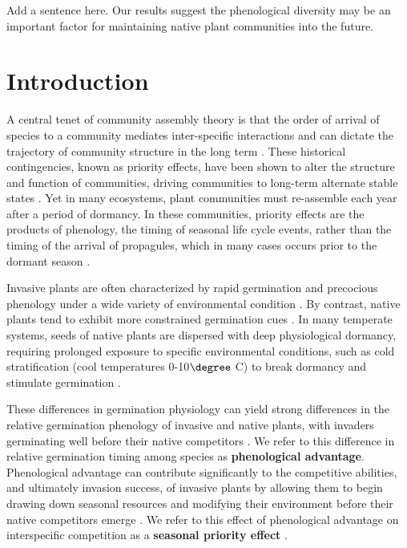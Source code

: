 \documentclass{article}\usepackage[]{graphicx}\usepackage[]{color}
\begin{document}
Add a sentence here. Our results suggest the phenological diversity may be an important factor for maintaining native plant communities into the future. %


\section*{Introduction}
 A central tenet of community assembly theory is that the order of arrival of species to a community mediates inter-specific interactions and can dictate the trajectory of community structure in the long term \citep{Fukami2015}. These historical contingencies, known as priority effects, have been shown to alter the structure and function of communities, driving communities to long-term alternate stable states \citep{Fukami2011}. Yet in many ecosystems, plant communities must re-assemble each year after a period of dormancy. In these communities, priority effects are the products of phenology, the timing of seasonal life cycle events,%
rather than the timing of the arrival of propagules, which in many cases occurs prior to the dormant season \citep{Rudolf:2019aa,Howe:1982aa,Baskin:1988aa}. 

Invasive plants are often characterized by rapid germination and precocious phenology under a wide variety of environmental condition \citep{Gioria2018,Gioria:2017wo,Wolkovich:2011uh,Smith:2013uj}. By contrast, native plants tend to exhibit more constrained germination cues \citep{Marushia:2010ug}. In many temperate systems, seeds of native plants are dispersed with deep physiological dormancy, requiring prolonged exposure to specific environmental conditions, such as cold stratification (cool temperatures 0-10$\degree$ C) to break dormancy and stimulate germination \citep{Brink:2013wr,Cavieres:2017aa,Bradford:2007tj}.

These differences in germination physiology can yield strong differences in the relative germination phenology of invasive and native plants, with invaders germinating well before their native competitors \citep{Gioria:2017wo}. We refer to this difference in relative germination timing among species as \textbf{phenological advantage}. Phenological advantage can contribute significantly to the competitive abilities, and ultimately invasion success, of invasive plants by allowing them to begin drawing down seasonal resources and modifying their environment before their native competitors emerge \citep{Kardol2013}. We refer to this effect of phenological advantage on interspecific competition as a \textbf{seasonal priority effect} \citep{Wainwright_2011}.
\end{document}
